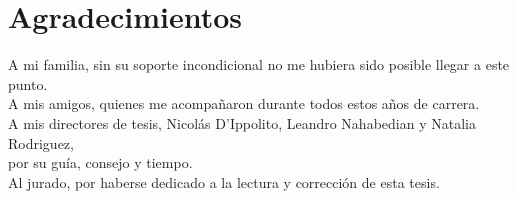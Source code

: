 \chapter*{Agradecimientos}

\noindent
A mi familia, sin su soporte incondicional no me hubiera sido posible llegar a este punto.\\ 
A mis amigos, quienes me acompañaron durante todos estos años de carrera.\\ 
A mis directores de tesis, Nicolás D'Ippolito, Leandro Nahabedian y Natalia Rodriguez,\\ 
por su guía, consejo y tiempo.\\ 
Al jurado, por haberse dedicado a la lectura y corrección de esta tesis.